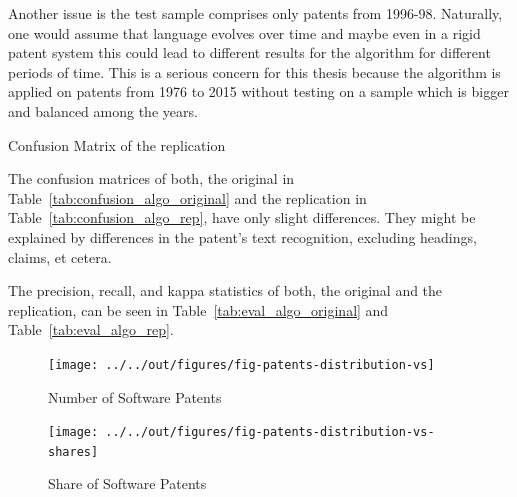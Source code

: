 \documentclass[12pt, a4paper, abstract, parskip]{scrartcl}
\newcommand{\ra}[1]{\renewcommand{\arraystretch}{#1}}
\theoremstyle{definition}
\begin{document}
Another issue is the test sample comprises only patents from 1996-98.
Naturally, one would assume that language evolves over time and maybe even in a
rigid patent system this could lead to different results for the algorithm for
different periods of time. This is a serious concern for this thesis because
the algorithm is applied on patents from 1976 to 2015 without testing on a
sample which is bigger and balanced among the years.

\begin{table}[tb]\caption{Confusion Matrix of the replication}\label{tab:confusion_algo_rep}\centering\ra{1.3}
    
\end{table}

The confusion matrices of both, the original in
Table~\ref{tab:confusion_algo_original} and the replication in
Table~\ref{tab:confusion_algo_rep}, have only slight differences. They might be
explained by differences in the patent's text recognition, excluding headings,
claims, et cetera.

The precision, recall, and kappa statistics of both, the original and the
replication, can be seen in Table~\ref{tab:eval_algo_original} and
Table~\ref{tab:eval_algo_rep}.

\begin{figure}[tb]
	\centering
	\texttt{[image: ../../out/figures/fig-patents-distribution-vs]}
	\caption{Number of Software Patents}
	\label{fig:softpat}
\end{figure}

\begin{figure}[tb]
	\centering
	\texttt{[image: ../../out/figures/fig-patents-distribution-vs-shares]}
	\caption{Share of Software Patents}
	\label{fig:sharesoft}
\end{figure}
\end{document}
